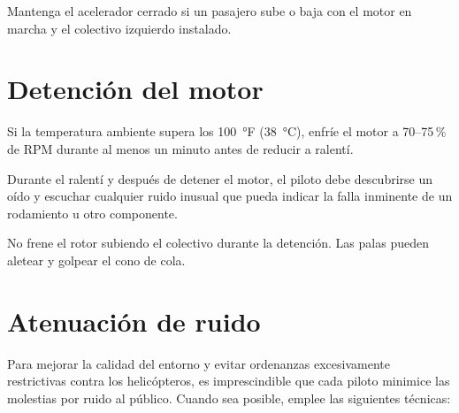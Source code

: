 \begin{precaucion}
Mantenga el acelerador cerrado si un pasajero sube o baja con el motor en marcha y el colectivo izquierdo instalado.
\end{precaucion}

\section{Detención del motor}

\begin{checklist}
\end{checklist}

\begin{nota}
Si la temperatura ambiente supera los 100~°F (38~°C), enfríe el motor a 70--75\,\% de RPM durante al menos un minuto antes de reducir a ralentí.
\end{nota}

\begin{nota}
Durante el ralentí y después de detener el motor, el piloto debe descubrirse un oído y escuchar cualquier ruido inusual que pueda indicar la falla inminente de un rodamiento u otro componente.
\end{nota}

\begin{precaucion}
No frene el rotor subiendo el colectivo durante la detención. Las palas pueden aletear y golpear el cono de cola.
\end{precaucion}

\section{Atenuación de ruido}

Para mejorar la calidad del entorno y evitar ordenanzas excesivamente restrictivas contra los helicópteros, es imprescindible que cada piloto minimice las molestias por ruido al público. Cuando sea posible, emplee las siguientes técnicas:

